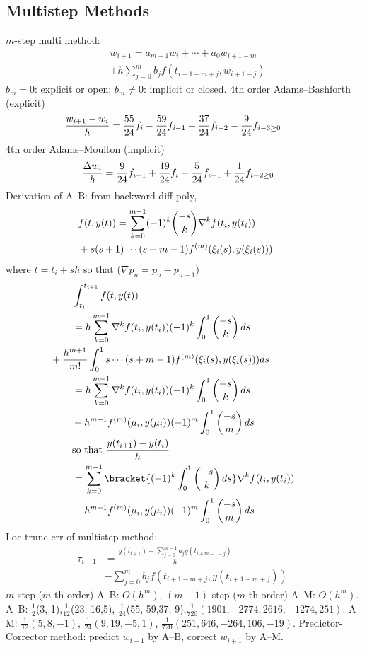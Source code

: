 \documentclass[b4paper,10pt]{memoir}
\begin{document}
\begin{multicols*}{3}
    \section{Multistep Methods}
    \s $m$-step multi method:
    \begin{align*}
         & w_{i+1} = a_{m-1} w_i + \cdots + a_0 w_{i+1-m}
        \\&+\textstyle h\sum_{j=0}^m b_j f (t_{i+1-m+j} , w_{i+1-j})
    \end{align*}
    \s $b_m=0$: explicit or open;\nl
    \s $b_m\ne 0$: implicit or closed. \nl
    \s 4th order Adams--Bashforth (explicit)
    \[\mkern-40mu \frac{w_{i+1}-w_i}h = \frac{55}{24}f_i - \frac{59}{24}f_{i-1} + \frac{37}{24}f_{i-2} -\frac{9}{24}f_{i-3\ge 0} \]
    \s 4th order Adams--Moulton (implicit)
    \[\mkern-20mu \frac{\Delta w_i}h = \frac{9}{24}f_{i+1} +\frac{19}{24}f_{i} - \frac{5}{24}f_{i-1} +\frac{1}{24}f_{i-2\ge 0} \]
    \s Derivation of A--B: from backward diff poly,
    \begin{align*}
         & \mkern-30mu f(t,y(t)) = \sum_{k=0}^{m-1} (-1)^k \binom{-s}k\nabla^k f(t_i,y(t_i))
        \\& \mkern-30mu + s(s+1)\cdots(s+m-1) f^{(m)}(\xi_i(s), y(\xi_i(s)))
    \end{align*}
    where $t=t_i+sh$ so that ($\nabla p_n=p_n-p_{n-1}$)
    \begin{align*}
         & \int_{t_i}^{t_{i+1}} f(t,y(t))
        \\ &= h\sum_{k=0}^{m-1} \nabla^k f(t_i,y(t_i)) (-1)^k\int_0^1\binom{-s}k\,ds
        \\& \mkern-40mu+ \frac{h^{m+1}}{m!}\int_0^1 s\cdots(s+m-1) f^{(m)}(\xi_i(s), y(\xi_i(s)))ds
        \\ &= h\sum_{k=0}^{m-1} \nabla^k f(t_i,y(t_i)) (-1)^k\int_0^1\binom{-s}k\,ds
        \\ &+ h^{m+1}f^{(m)}(\mu_i,y(\mu_i))(-1)^m\int_0^1\binom{-s}m\,ds\\
         & \text{so that }\frac{y(t_{i+1})-y(t_i)}h
        \\ &=\sum_{k=0}^{m-1} \bracket{(-1)^k\int_0^1\binom{-s}k\,ds}\nabla^k f(t_i,y(t_i))
        \\&+ h^{m+1}f^{(m)}(\mu_i,y(\mu_i))(-1)^m\int_0^1\binom{-s}m\,ds
    \end{align*}
    \s Loc trunc err of multistep method:
    \begin{align*}
        \tau_{i+1} & = \frac{y(t_{i+1})-\sum_{j=0}^{m-1}a_{j}y(t_{i+m-1-j})}{h}
        \\ &-\textstyle \sum_{j=0}^m b_j f(t_{i+1-m+j},y(t_{i+1-m+j})).
    \end{align*}
    \s $m$-step ($m$-th order) A--B: $O(h^m)$,\nl
    \s $(m-1)$-step ($m$-th order) A--M: $O(h^m)$.\nl
    \s A--B: $\frac 12$(3,-1),$\frac1{12}$(23,-16,5), $\frac 1{24}$(55,-59,37,-9),\nl $\frac1{720}(1901,-2774,2616,-1274,251)$.\nl
    \s A--M: $\frac1{12}(5,8,-1)$, $\frac 1{24}(9,19,-5,1)$, \nl $\frac1{720}(251,646,-264,106,-19).$\nl
    \s Predictor-Corrector method: predict $w_{i+1}$ by A--B, correct $w_{i+1}$ by A--M.


\end{multicols*}
\end{document}

